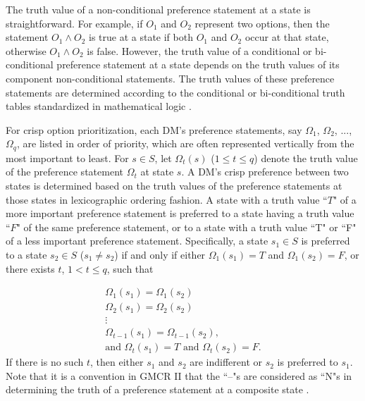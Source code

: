The truth value of a non-conditional preference statement at a state is straightforward. For example, if $O_1$ and $O_2$ represent two options, then the statement $O_1 \land O_2$ is true at a state if both $O_1$ and $O_2$ occur at that state, otherwise $O_1 \land O_2$ is false. However, the truth value of a conditional or bi-conditional preference statement at a state depends on the truth values of its component non-conditional statements. The truth values of these preference statements are determined according to the conditional or bi-conditional truth tables standardized in mathematical logic \citep{Chiswell&Hodges2007}.

For crisp option prioritization, each DM's preference statements, say $\Omega_1$, $\Omega_2$, $...$, $\Omega_q$, are listed in order of priority, which are often represented vertically from the most important to least. For $s\in S$, let $\Omega_t(s)$ ($1\leq t\leq q$) denote the truth value of the preference statement $\Omega_t$ at state $s$. A DM's crisp preference between two states is determined based on the truth values of the preference statements at those states in lexicographic ordering fashion. A state with a truth value ``$T$" of a more important preference statement is preferred to a state having a truth value ``$F$" of the same preference statement, or to a state with a truth value ``T" or ``F" of a less important preference statement. Specifically, a state $s_1 \in S$ is preferred to a state $s_2 \in S$ ($s_1 \neq s_2$) if and only if either $\Omega_1(s_1)=T$ and $\Omega_1(s_2)=F$, or there exists $t$, $1 < t \leq q$, such that

\begin{equation}\label{option-pref-algorithm}
\begin{array}{c}
\Omega_1(s_1) = \Omega_1(s_2) \\
\Omega_2(s_1) = \Omega_2(s_2) \\
            \vdots             \\
\Omega_{t-1}(s_1) = \Omega_{t-1}(s_2), \\
\text{and }\Omega_t(s_1) = T \text{ and } \Omega_t(s_2) = F.
\end{array}
\end{equation}
If there is no such $t$, then either $s_1$ and $s_2$ are indifferent or $s_2$ is preferred to $s_1$. Note that it is a convention in GMCR II that the ``--"s are considered as ``N"s in determining the truth of a preference statement at a composite state \citep{Peng-et-al1997, Peng1999, Fang-et-al2003}.

